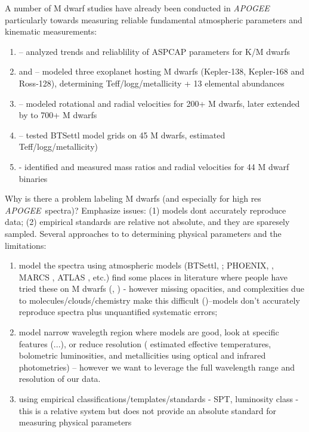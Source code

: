 \documentclass[modern]{aastex62}
\newcommand{\apogee}{\textsl{APOGEE}}
\begin{document}
A number of M dwarf studies have already been conducted in \apogee\, particularly towards measuring reliable fundamental atmospheric parameters and kinematic measurements:
\begin{enumerate}
\item \citealt{Schmidt:2016} -- analyzed trends and reliablility of ASPCAP parameters for K/M dwarfs
\item \citealt{Souto:2017} and \citealt{Souto:2018} -- modeled three exoplanet hosting M dwarfs (Kepler-138, Kepler-168 and Ross-128), determining Teff/logg/metallicity + 13 elemental abundances
\item \citealt{Desphande:2013} -- modeled rotational and radial velocities for 200+ M dwarfs, later extended by \citealt{Gilhool:2018} to 700+ M dwarfs
\item \citealt{Rajpurohit:2018} -- tested BTSettl model grids on 45 M dwarfs, estimated Teff/logg/metallicity)
\item \citealt{Skinner:2018} - identified and measured mass ratios and radial velocities for 44 M dwarf binaries
\end{enumerate}


Why is there a problem labeling M dwarfs (and especially for high res \apogee\ spectra)? Emphasize issues: (1) models dont accurately reproduce data; (2) empirical standards are relative not absolute, and they are sparesely sampled. Several approaches to to determining physical parameters and the limitations:

\begin{enumerate}
\item model the spectra using atmospheric models (BTSettl, \citealt{Allard:2011}; PHOENIX, \citealt{Husser:2013}, MARCS \citealt{Gustafsson:2008}, ATLAS \citealt{Castelli:2004}, etc.) find some places in literature where people have tried these on M dwarfs (\citealt{Rajpurohit:2014}, \citealt{Rajpurohit:2018}) - however missing opacities, and complexities due to molecules/clouds/chemistry make this difficult (\citealt{Allard:2013})--models don't accurately reproduce spectra plus unquantified systematic errors; 

\item model narrow wavelegth region where models are good, look at specific features (\citealt{Rojas-Ayala:2012}...), or reduce resolution (\citealt{Casagrande:2008} estimated effective temperatures, bolometric luminosities, and metallicities using optical and infrared photometries) -- however we want to leverage the full wavelength range and resolution of our data.

\item using empirical classifications/templates/standards - SPT, luminosity class - this is a relative system but does not provide an absolute standard for measuring physical parameters
\end{enumerate}
\end{document}
